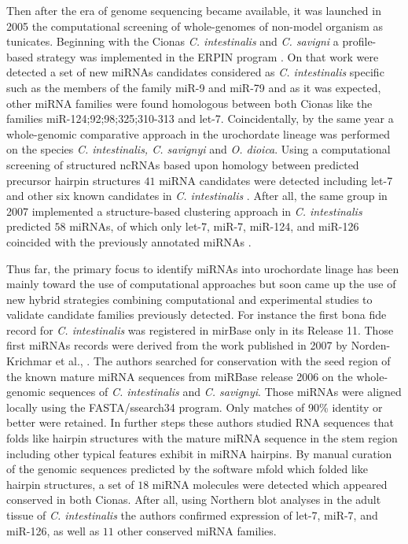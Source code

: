 \documentclass[graybox]{svmult}
\begin{document}
Then after the era of genome sequencing became available, it was launched in 
2005 the computational screening of whole-genomes of non-model organism as 
tunicates. Beginning with the Cionas \textit{C. intestinalis} and \textit{C. 
savigni} a profile-based strategy was implemented in the ERPIN program 
\cite{Legendre2005}. On that work were detected a set of new miRNAs candidates 
considered as \textit{C. intestinalis} specific such as the members of the 
family miR-9 and miR-79 and as it was expected, other miRNA families were found 
homologous between both Cionas like the families miR-124;92;98;325;310-313 and 
let-7. Coincidentally, by the same year a whole-genomic comparative approach in 
the urochordate lineage was performed on the species \textit{C. intestinalis, C. 
savignyi} and \textit{O. dioica}. Using a computational screening of structured 
ncRNAs based upon homology between predicted precursor hairpin structures  $41$ 
miRNA candidates were detected including let-7 and other six known candidates in 
\textit{C. intestinalis} \cite{Missal2005}. After all, the same group in 2007 
implemented a structure-based clustering approach in \textit{C. intestinalis} 
predicted $58$ miRNAs, of which only let-7, miR-7, miR-124, and miR-126 
coincided with the previously annotated miRNAs \cite{Will2007}. 

Thus far, the primary focus to identify miRNAs into urochordate linage has been 
mainly toward the use of computational approaches but soon came up the use of 
new hybrid strategies combining computational and experimental studies to 
validate candidate families previously detected. For instance the first bona 
fide record for \textit{C. intestinalis} was registered in mirBase only in its 
Release 11. Those first miRNAs records were derived from the work published in 
2007 by Norden-Krichmar et al., \cite{Norden-Krichmar2007}. The authors searched 
for conservation with the seed region of the known mature miRNA sequences from 
miRBase release 2006 on the whole-genomic sequences of \textit{C. intestinalis} 
and \textit{C. savignyi}. Those miRNAs were aligned locally using the 
FASTA/ssearch34 program. Only matches of 90\% identity or better were retained. 
In further steps these authors studied RNA sequences that folds like hairpin 
structures with the mature miRNA sequence in the stem region including other 
typical features exhibit in miRNA hairpins. By manual curation of the genomic 
sequences predicted by the software mfold which folded like hairpin structures, 
a set of $18$ miRNA molecules were detected which appeared conserved in both 
Cionas. After all, using  Northern blot analyses in the adult tissue of 
\textit{C. intestinalis} the authors confirmed expression of  let-7, miR-7, and 
miR-126, as well as $11$ other conserved miRNA families.
\end{document}

